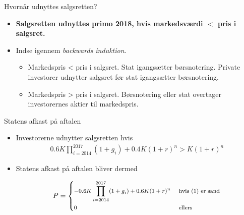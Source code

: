 \documentclass{beamer}
\begin{document}
\begin{frame}{Hvornår udnyttes salgsretten?}

\begin{itemize}
	
	\item \textbf{Salgsretten udnyttes primo 2018, hvis markedsværdi $<$ pris i salgsret.}

\item Indse igennem \emph{backwards induktion}. 

\begin{itemize}

\item Markedspris < pris i salgsret. Stat igangsætter børsnotering. Private investorer udnytter salgsret før stat igangsætter børsnotering.

\item Markedspris > pris i salgsret. Børsnotering eller stat overtager investorernes aktier til markedspris.

\end{itemize}

\end{itemize}

\end{frame}

\begin{frame}{Statens afkast på aftalen}

\begin{itemize}

\item Investorerne udnytter salgsretten hvis
\begin{align}
0.6K\prod_{i=2014}^{2017}(1+g_i)+0.4K(1+r)^n>K(1+r)^n 
\end{align}
\pause
\item Statens afkast på aftalen bliver dermed

\begin{align}
\footnotesize
P= 
\begin{dcases} 
-0.6K \prod_{i=2014}^{2017} (1+g_i)+0.6K(1+r)^n &\text{     hvis    (1) er sand} \\ %
0  &\text{   ellers }
\end {dcases}
\label{eq:Goldman_deal}
\end{align}

\end{itemize}
\end{frame}
\end{document}
